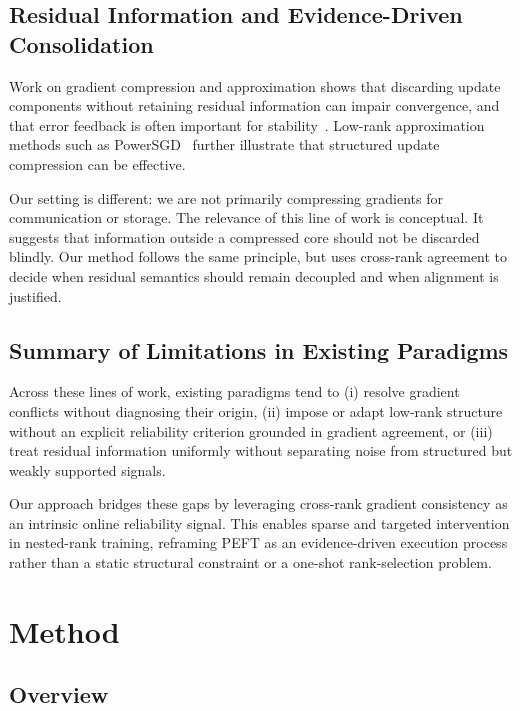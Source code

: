 \documentclass{article}
\begin{document}
\subsection{Residual Information and Evidence-Driven Consolidation}

Work on gradient compression and approximation shows that discarding update
components without retaining residual information can impair convergence, and
that error feedback is often important for stability~\cite{karimireddy2019error}.
Low-rank approximation methods such as PowerSGD~\cite{vogels2019powersgd}
further illustrate that structured update compression can be effective.

Our setting is different: we are not primarily compressing gradients for
communication or storage.
The relevance of this line of work is conceptual.
It suggests that information outside a compressed core should not be discarded
blindly.
Our method follows the same principle, but uses cross-rank agreement to decide
when residual semantics should remain decoupled and when alignment is justified.

\subsection{Summary of Limitations in Existing Paradigms}

Across these lines of work, existing paradigms tend to
(i) resolve gradient conflicts without diagnosing their origin,
(ii) impose or adapt low-rank structure without an explicit reliability criterion
grounded in gradient agreement,
or (iii) treat residual information uniformly without separating noise
from structured but weakly supported signals.

Our approach bridges these gaps by leveraging cross-rank gradient consistency
as an intrinsic online reliability signal.
This enables sparse and targeted intervention in nested-rank training,
reframing PEFT as an evidence-driven execution process rather than a static
structural constraint or a one-shot rank-selection problem.
\section{Method}
\label{sec:method}


\subsection{Overview}
\label{sec:method-overview}
\end{document}
